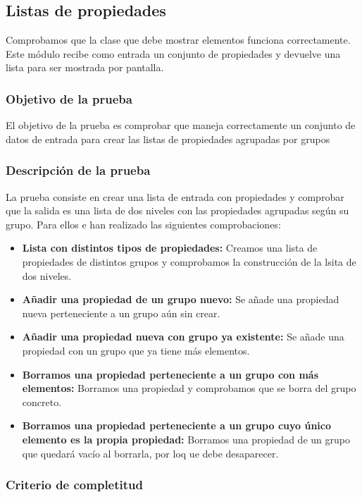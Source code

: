 \bigskip
\subsection{Listas de propiedades}

Comprobamos que la clase que debe mostrar elementos funciona correctamente. Este módulo recibe como entrada un conjunto de propiedades y devuelve una lista para ser mostrada por pantalla.

\subsubsection{Objetivo de la prueba}

El objetivo de la prueba es comprobar que maneja correctamente un conjunto de datos de entrada para crear las listas de propiedades agrupadas por grupos

\subsubsection{Descripción de la prueba}

La prueba consiste en crear una lista de entrada con propiedades y comprobar que la salida es una lista de dos niveles con las propiedades agrupadas según su grupo. Para ellos e han realizado las siguientes comprobaciones:

\begin{itemize}
  \item \textbf{Lista con distintos tipos de propiedades:} Creamos una lista de propiedades de distintos grupos y comprobamos la construcción de la lsita de dos niveles.
  \item \textbf{Añadir una propiedad de un grupo nuevo:} Se añade una propiedad nueva perteneciente a un grupo aún sin crear.
  \item \textbf{Añadir una propiedad nueva con grupo ya existente:} Se añade una propiedad con un grupo que ya tiene más elementos.
  \item \textbf{Borramos una propiedad perteneciente a un grupo con más elementos:} Borramos una propiedad y comprobamos que se borra del grupo concreto.
  \item \textbf{Borramos una propiedad perteneciente a un grupo cuyo único elemento es la propia propiedad:} Borramos una propiedad de un grupo que quedará vacío al borrarla, por loq ue debe desaparecer.   
\end{itemize}

\subsubsection{Criterio de completitud}

